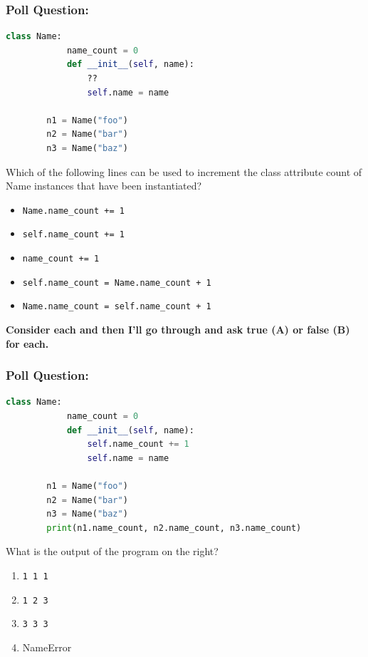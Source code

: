 \documentclass{beamer}
\begin{document}
%
%
%
\begin{frame}[fragile]
    \frametitle{Poll Question: }
    \begin{minipage}{0.35\textwidth}
        \begin{lstlisting}[language=Python, autogobble, basicstyle=\tiny]
        class Name:
            name_count = 0
            def __init__(self, name):
                ??
                self.name = name

        n1 = Name("foo")
        n2 = Name("bar")
        n3 = Name("baz")
        \end{lstlisting}
    \end{minipage}
    \hfill
    \begin{minipage}{0.59\textwidth}
        Which of the following lines can be used to increment the class attribute count of Name instances that have been instantiated?
        \begin{itemize}
            \item \lstinline|Name.name_count += 1|
            \item \lstinline|self.name_count += 1|
            \item \lstinline|name_count += 1|
            \item \lstinline|self.name_count = Name.name_count + 1|
            \item \lstinline|Name.name_count = self.name_count + 1|
        \end{itemize}
    \end{minipage}
    \vfill
    \textbf{Consider each and then I'll go through and ask true (A) or false (B) for each.}
\end{frame}

%
%
%
\begin{frame}[fragile]
    \frametitle{Poll Question: }
    \begin{minipage}{0.49\textwidth}
        \begin{lstlisting}[language=Python, autogobble]
        class Name:
            name_count = 0
            def __init__(self, name):
                self.name_count += 1
                self.name = name

        n1 = Name("foo")
        n2 = Name("bar")
        n3 = Name("baz")
        print(n1.name_count, n2.name_count, n3.name_count)
        \end{lstlisting}
    \end{minipage}
    \hfill
    \begin{minipage}{0.49\textwidth}
        What is the output of the program on the right?
        \begin{enumerate}[A]
            \item \lstinline|1 1 1|
            \item \lstinline|1 2 3|
            \item \lstinline|3 3 3|
            \item NameError
        \end{enumerate}
    \end{minipage}
\end{frame}
\end{document}
